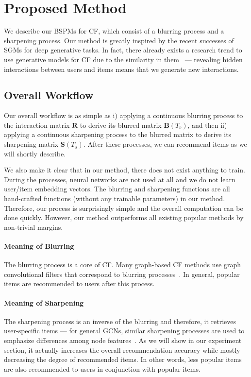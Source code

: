 \documentclass[sigconf,natbib=true]{acmart}
\begin{document}
\section{Proposed Method}
We describe our BSPMs for CF, which consist of a blurring process and a sharpening process. Our method is greatly inspired by the recent successes of SGMs for deep generative tasks. In fact, there already exists a research trend to use generative models for CF due to the similarity in them~\cite{Wang2017IRGAN,Chae2018CFGAN,Wang2018GraphGAN,Chae2019RAGANBT,Wang2019AugCF,Sun2020LARA,Chen2021TagRec} --- revealing hidden interactions between users and items means that we generate new interactions.

\subsection{Overall Workflow}\label{sec:overall}
Our overall workflow is as simple as i) applying a continuous blurring process to the interaction matrix $\bm{R} $ to derive its blurred matrix $\bm{B}(T_b)$, and then ii) applying a continuous sharpening process to the blurred matrix to derive its sharpening matrix $\bm{S}(T_s)$. After these processes, we can recommend items as we will shortly describe.

We also make it clear that in our method, there does not exist anything to train. During the processes, neural networks are not used at all and we do not learn user/item embedding vectors. The blurring and sharpening functions are all hand-crafted functions (without any trainable parameters) in our method. Therefore, our process is surprisingly simple and the overall computation can be done quickly. However, our method outperforms all existing popular methods by non-trivial margins.

\paragraph{Meaning of Blurring} The blurring process is a core of CF. Many graph-based CF methods use graph convolutional filters that correspond to blurring processes~\cite{He20LightGCN,Shen21GFCF,balcilar2021analyzing}. In general, popular items are recommended to users after this process.

\paragraph{Meaning of Sharpening} The sharpening process is an inverse of the blurring and therefore, it retrieves user-specific items --- for general GCNs, similar sharpening processes are used to emphasize differences among node features~\cite{Bo2021fagcn,chien2021GPRGNN}. As we will show in our experiment section, it actually increases the overall recommendation accuracy while mostly decreasing the degree of recommended items. In other words, less popular items are also recommended to users in conjunction with popular items.
\end{document}
